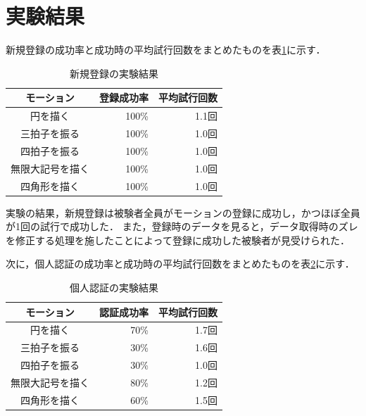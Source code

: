\documentclass[11pt]{jreport}
\begin{document}
	\section{実験結果}
    新規登録の成功率と成功時の平均試行回数をまとめたものを表\ref{regResult}に示す．

    \begin{table}[htb]
        \begin{center}
            \caption{新規登録の実験結果}
            \label{regResult}
            \begin{tabular}{|c|r|r|} \hline
                モーション & 登録成功率 & 平均試行回数 \\ \hline \hline
                円を描く & 100\% & 1.1回 \\ \hline
                三拍子を振る & 100\% & 1.0回 \\ \hline
                四拍子を振る & 100\% & 1.0回 \\ \hline
                無限大記号を描く & 100\% & 1.0回 \\ \hline
                四角形を描く & 100\% & 1.0回 \\ \hline
            \end{tabular}
        \end{center}
    \end{table}

    実験の結果，新規登録は被験者全員がモーションの登録に成功し，かつほぼ全員が1回の試行で成功した．
    また，登録時のデータを見ると，データ取得時のズレを修正する処理を施したことによって登録に成功した被験者が見受けられた．

    次に，個人認証の成功率と成功時の平均試行回数をまとめたものを表\ref{authResult}に示す．

    \begin{table}[htb]
        \begin{center}
            \caption{個人認証の実験結果}
            \label{authResult}
            \begin{tabular}{|c|r|r|} \hline
                モーション & 認証成功率 & 平均試行回数 \\ \hline \hline
                円を描く & 70\% & 1.7回 \\ \hline
                三拍子を振る & 30\% & 1.6回 \\ \hline
                四拍子を振る & 30\% & 1.0回 \\ \hline
                無限大記号を描く & 80\% & 1.2回 \\ \hline
                四角形を描く & 60\% & 1.5回 \\ \hline
            \end{tabular}
        \end{center}
    \end{table}
\end{document}
